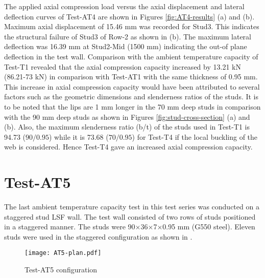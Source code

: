 The applied axial compression load versus the axial displacement and lateral deflection curves of Test-AT4 are shown in Figures \ref{fig:AT4-results} (a) and (b). Maximum axial displacement of 15.46 mm was recorded for Stud3. This indicates the structural failure of Stud3 of Row-2 as shown in  (b). The maximum lateral deflection was 16.39 mm at Stud2-Mid (1500 mm) indicating the out-of plane deflection in the test wall. Comparison with the ambient temperature capacity of Test-T1 revealed that the axial compression capacity increased by 13.21 kN (86.21-73 kN) in comparison with Test-AT1 with the same thickness of 0.95 mm. This increase in axial compression capacity would have been attributed to several factors such as the geometric dimensions and slenderness ratios of the studs. It is to be noted that the lips are 1 mm longer in the 70 mm deep studs in comparison with the 90 mm deep studs as shown in Figures \ref{fig:stud-cross-section} (a) and (b). Also, the maximum slenderness ratio (b/t) of the studs used in Test-T1 is 94.73 ($90/0.95$) while it is 73.68 ($70/0.95$) for Test-T4 if the local buckling of the web is considered. Hence Test-T4 gave an increased axial compression capacity. 

\section{Test-AT5}

The last ambient temperature capacity test in this test series was conducted on a staggered stud LSF wall. The test wall consisted of two rows of studs positioned in a staggered manner. The studs were 90$\times$36$\times$7$\times$0.95 mm (G550 steel). Eleven studs were used in the staggered configuration as shown in . 
\begin{figure}[!htbp]
	\centering
			\texttt{[image: AT5-plan.pdf]}\\
		\caption{Test-AT5 configuration}
		\label{fig:AT5-plan}
\end{figure}

